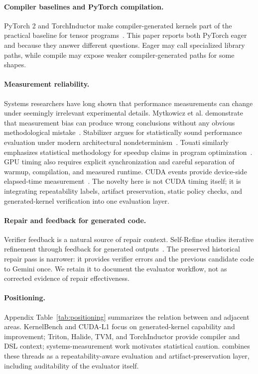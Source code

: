 \paragraph{Compiler baselines and PyTorch compilation.}
PyTorch 2 and TorchInductor make compiler-generated kernels part of the practical baseline for tensor programs~\cite{ansel2024pytorch2}. This paper reports both PyTorch eager and \compile{} because they answer different questions. Eager may call specialized library paths, while compile may expose weaker compiler-generated paths for some shapes.

\paragraph{Measurement reliability.}
Systems researchers have long shown that performance measurements can change under seemingly irrelevant experimental details. Mytkowicz et al. demonstrate that measurement bias can produce wrong conclusions without any obvious methodological mistake~\cite{mytkowicz2009wrongdata}. Stabilizer argues for statistically sound performance evaluation under modern architectural nondeterminism~\cite{curtsinger2013stabilizer}. Touati similarly emphasizes statistical methodology for speedup claims in program optimization~\cite{touati2009statistical}. GPU timing also requires explicit synchronization and careful separation of warmup, compilation, and measured runtime. CUDA events provide device-side elapsed-time measurement~\cite{nvidiaCudaEvents}. The novelty here is not CUDA timing itself; it is integrating repeatability labels, artifact preservation, static policy checks, and generated-kernel verification into one evaluation layer.

\paragraph{Repair and feedback for generated code.}
Verifier feedback is a natural source of repair context. Self-Refine studies iterative refinement through feedback for generated outputs~\cite{madaan2023selfrefine}. The preserved historical repair pass is narrower: it provides verifier errors and the previous candidate code to Gemini once. We retain it to document the evaluator workflow, not as corrected evidence of repair effectiveness.

\paragraph{Positioning.}
Appendix Table~\ref{tab:positioning} summarizes the relation between \okf{} and adjacent areas. KernelBench and CUDA-L1 focus on generated-kernel capability and improvement; Triton, Halide, TVM, and TorchInductor provide compiler and DSL context; systems-measurement work motivates statistical caution. \okf{} combines these threads as a repeatability-aware evaluation and artifact-preservation layer, including auditability of the evaluator itself.
